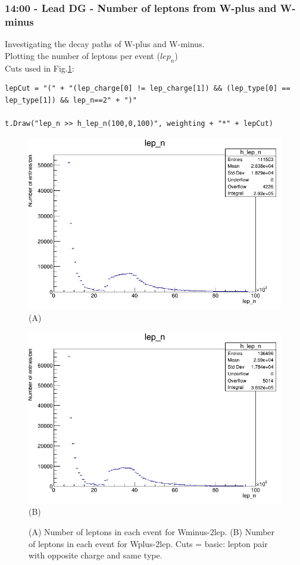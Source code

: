 \subsubsection*{14:00 - Lead DG - Number of leptons from W-plus and W-minus}
Investigating the decay paths of W-plus and W-minus.
\\
Plotting the number of leptons per event ($lep_n$)
\\
Cuts used in Fig.\ref{fig:14-00_18-02-21}:
\begin{lstlisting}
lepCut = "(" + "(lep_charge[0] != lep_charge[1]) && (lep_type[0] == lep_type[1]) && lep_n==2" + ")"

t.Draw("lep_n >> h_lep_n(100,0,100)", weighting + "*" + lepCut)
\end{lstlisting}
\begin{figure}[h!]
    \centering
    \begin{minipage}{0.5\textwidth}
        \centering
        \includegraphics[width=\linewidth]{plots/18-02-2021/Wminus_2lep_lep_n_0-100_18-02-2021_14-12.png}
        (A)
    \end{minipage}\hfill
    \begin{minipage}{0.5\textwidth}
        \centering
        \includegraphics[width=\linewidth]{plots/18-02-2021/Wplus_2lep_slow_lep_n_0-100000_18-02-21_14-17.png}
        (B)
    \end{minipage}
    \caption{(A) Number of leptons in each event for Wminus-2lep. (B) Number of leptons in each event for Wplus-2lep. Cuts = basic: lepton pair with opposite charge and same type.}
    \label{fig:14-00_18-02-21}
\end{figure}
